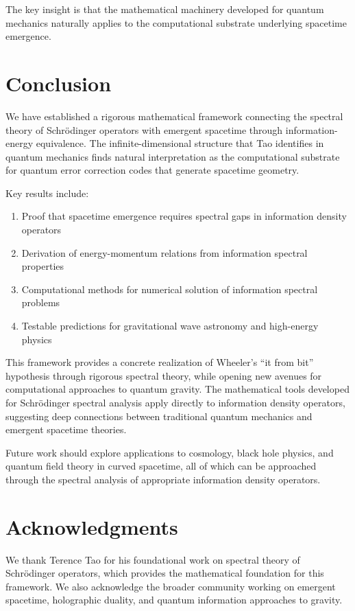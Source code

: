 \documentclass[12pt]{article}
\begin{document}
The key insight is that the mathematical machinery developed for quantum mechanics naturally applies to the computational substrate underlying spacetime emergence.

\section{Conclusion}

We have established a rigorous mathematical framework connecting the spectral theory of Schrödinger operators with emergent spacetime through information-energy equivalence. The infinite-dimensional structure that Tao identifies in quantum mechanics finds natural interpretation as the computational substrate for quantum error correction codes that generate spacetime geometry.

Key results include:
\begin{enumerate}
\item Proof that spacetime emergence requires spectral gaps in information density operators
\item Derivation of energy-momentum relations from information spectral properties  
\item Computational methods for numerical solution of information spectral problems
\item Testable predictions for gravitational wave astronomy and high-energy physics
\end{enumerate}

This framework provides a concrete realization of Wheeler's ``it from bit'' hypothesis through rigorous spectral theory, while opening new avenues for computational approaches to quantum gravity. The mathematical tools developed for Schrödinger spectral analysis apply directly to information density operators, suggesting deep connections between traditional quantum mechanics and emergent spacetime theories.

Future work should explore applications to cosmology, black hole physics, and quantum field theory in curved spacetime, all of which can be approached through the spectral analysis of appropriate information density operators.

\section*{Acknowledgments}

We thank Terence Tao for his foundational work on spectral theory of Schrödinger operators, which provides the mathematical foundation for this framework. We also acknowledge the broader community working on emergent spacetime, holographic duality, and quantum information approaches to gravity.
\end{document}

